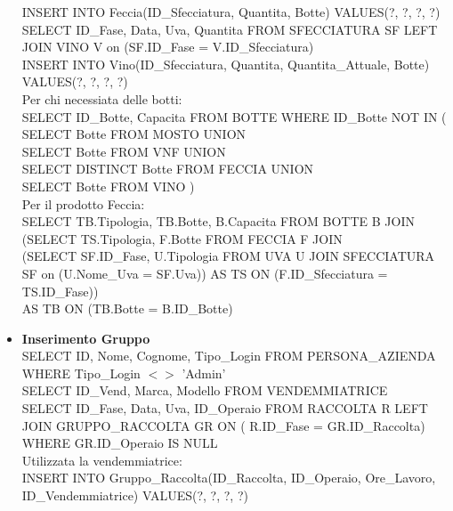 \documentclass{article}
\begin{document}
\begin{itemize}
INSERT INTO Feccia(ID\_Sfecciatura, Quantita, Botte) VALUES(?, ?, ?, ?)\\\newline
SELECT ID\_Fase, Data, Uva, Quantita FROM SFECCIATURA SF LEFT JOIN VINO V on (SF.ID\_Fase = V.ID\_Sfecciatura)\\\newline
INSERT INTO Vino(ID\_Sfecciatura, Quantita, Quantita\_Attuale, Botte) VALUES(?, ?, ?, ?)\\\newline
Per chi necessiata delle botti:\\
SELECT ID\_Botte, Capacita FROM BOTTE WHERE ID\_Botte NOT IN (\\
SELECT Botte FROM MOSTO UNION \\
SELECT Botte FROM VNF UNION\\
SELECT DISTINCT Botte FROM FECCIA UNION\\
SELECT Botte FROM VINO )\\\newline
Per il prodotto Feccia:\\
SELECT TB.Tipologia, TB.Botte, B.Capacita FROM BOTTE B JOIN \\
(SELECT TS.Tipologia, F.Botte FROM FECCIA F JOIN \\
(SELECT SF.ID\_Fase, U.Tipologia FROM UVA U JOIN SFECCIATURA SF on (U.Nome\_Uva = SF.Uva)) AS TS ON (F.ID\_Sfecciatura = TS.ID\_Fase)) \\
AS TB ON (TB.Botte = B.ID\_Botte)\\\newline
\item \textbf{Inserimento Gruppo}\\\newline
SELECT ID, Nome, Cognome, Tipo\_Login FROM PERSONA\_AZIENDA WHERE Tipo\_Login $<$$>$ 'Admin'\\\newline
SELECT ID\_Vend, Marca, Modello FROM VENDEMMIATRICE\\\newline
SELECT ID\_Fase, Data, Uva, ID\_Operaio FROM RACCOLTA R LEFT JOIN GRUPPO\_RACCOLTA GR ON ( R.ID\_Fase = GR.ID\_Raccolta) WHERE GR.ID\_Operaio IS NULL\\\newline
Utilizzata la vendemmiatrice:\\
INSERT INTO Gruppo\_Raccolta(ID\_Raccolta, ID\_Operaio, Ore\_Lavoro, ID\_Vendemmiatrice) VALUES(?, ?, ?, ?)\\\newline
$$
\end{itemize}
\end{document}
